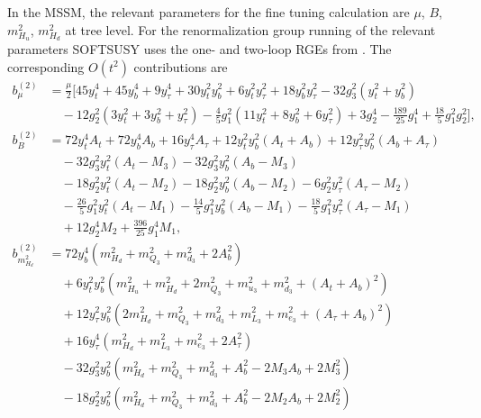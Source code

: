 \documentclass[preprint,amsmath,amssymb,aps,superscriptaddress,prd,
showpacs,floatfix,nofootinbib]{revtex4-1}
\begin{document}
In the MSSM, the relevant parameters for the fine tuning calculation are
$\mu$, $B$, $m_{H_u}^2$, $m_{H_d}^2$ at tree level.  For the
renormalization group running of the relevant parameters
SOFTSUSY uses the one- and two-loop RGEs from
\cite{Barger:1993gh, Martin:1993zk}. The corresponding $O(t^2)$
contributions are
\begin{subequations} \label{eq:MSSMTreeLevelCoeffs}
\begin{align}
b_\mu^{(2)} &= \frac{\mu}{2} \Bigg [ 45 y_t^4 + 45 y_b^4 + 9 y_\tau^4
+ 30 y_t^2 y_b^2 + 6 y_t^2 y_\tau^2 + 18 y_b^2 y_\tau^2 - 32 g_3^2 ( y_t^2
+ y_b^2 ) \nonumber \\
& \quad {} - 12 g_2^2 ( 3 y_t^2 + 3 y_b^2 + y_\tau^2 ) - \frac{4}{5} g_1^2
( 11 y_t^2 + 8 y_b^2 + 6 y_\tau^2 ) + 3 g_2^4 - \frac{189}{25} g_1^4 +
\frac{18}{5} g_1^2 g_2^2 \Bigg ] , \label{eq:MSSMmub2} \\
b_B^{(2)} &= 72 y_t^4 A_t + 72 y_b^4 A_b + 16 y_\tau^4 A_\tau + 12 y_t^2 y_b^2
( A_t + A_b ) + 12 y_\tau^2 y_b^2 ( A_b + A_\tau ) \nonumber \\
& \quad {} - 32 g_3^2 y_t^2 ( A_t - M_3 ) - 32 g_3^2 y_b^2 ( A_b - M_3 )
\nonumber \\
& \quad {} - 18 g_2^2 y_t^2 ( A_t - M_2 ) - 18 g_2^2 y_b^2 ( A_b - M_2 )
- 6 g_2^2 y_\tau^2 ( A_\tau - M_2 ) \nonumber \\
& \quad {} - \frac{26}{5} g_1^2 y_t^2 ( A_t - M_1 ) - \frac{14}{5} g_1^2 y_b^2
( A_b - M_1 ) - \frac{18}{5} g_1^2 y_\tau^2 ( A_\tau - M_1 ) \nonumber \\
& \quad {} + 12 g_2^4 M_2 + \frac{396}{25} g_1^4 M_1 , \label{eq:MSSMBb2} \\
b_{m_{H_d}^2}^{(2)} &= 72 y_b^4 \left ( m_{H_d}^2 + m_{Q_3}^2 + m_{d_3}^2 +
2 A_b^2 \right ) \nonumber \\
& \quad {} + 6 y_t^2 y_b^2 \left ( m_{H_u}^2 + m_{H_d}^2 + 2 m_{Q_3}^2 +
m_{u_3}^2 + m_{d_3}^2 + ( A_t + A_b )^2 \right ) \nonumber \\
& \quad {} + 12 y_\tau^2 y_b^2 \left ( 2 m_{H_d}^2 + m_{Q_3}^2 + m_{d_3}^2 +
m_{L_3}^2 + m_{e_3}^2 + ( A_\tau + A_b )^2 \right ) \nonumber \\
& \quad {} + 16 y_\tau^4 \left ( m_{H_d}^2 + m_{L_3}^2 + m_{e_3}^2 +
2 A_\tau^2 \right ) \nonumber \\
& \quad {} - 32 g_3^2 y_b^2 \left ( m_{H_d}^2 + m_{Q_3}^2 + m_{d_3}^2 + A_b^2
- 2 M_3 A_b + 2 M_3^2 \right ) \nonumber \\
& \quad {} - 18 g_2^2 y_b^2 \left ( m_{H_d}^2 + m_{Q_3}^2 + m_{d_3}^2 + A_b^2
- 2 M_2 A_b + 2 M_2^2 \right ) \nonumber \\

\end{align}
\end{subequations}
\end{document}
